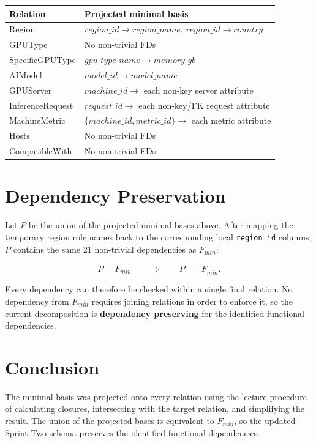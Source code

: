 \documentclass[11pt]{article}
\newcommand{\fd}{\rightarrow}
\newcommand{\code}[1]{\texttt{#1}}
\begin{document}
\begin{center}
\begin{tabular}{>{\raggedright\arraybackslash}p{} >{\raggedright\arraybackslash}p{}}
\toprule
\textbf{Relation} & \textbf{Projected minimal basis}\\
\midrule
Region & $region\_id \fd region\_name$, $region\_id \fd country$\\
GPUType & No non-trivial FDs\\
SpecificGPUType & $gpu\_type\_name \fd memory\_gb$\\
AIModel & $model\_id \fd model\_name$\\
GPUServer & $machine\_id \fd$ each non-key server attribute\\
InferenceRequest & $request\_id \fd$ each non-key/FK request attribute\\
MachineMetric & $\{machine\_id,metric\_id\} \fd$ each metric attribute\\
Hosts & No non-trivial FDs\\
CompatibleWith & No non-trivial FDs\\
\bottomrule
\end{tabular}
\end{center}

\section{Dependency Preservation}

Let $P$ be the union of the projected minimal bases above. After mapping the temporary
region role names back to the corresponding local \code{region\_id} columns, $P$ contains
the same 21 non-trivial dependencies as $F_{min}$:

\[
P = F_{min}
\qquad\Longrightarrow\qquad
P^{+}=F_{min}^{+}.
\]

Every dependency can therefore be checked within a single final relation. No dependency
from $F_{min}$ requires joining relations in order to enforce it, so the current
decomposition is \textbf{dependency preserving} for the identified functional dependencies.

\enlargethispage{3\baselineskip}
\section{Conclusion}

The minimal basis was projected onto every relation using the lecture procedure of
calculating closures, intersecting with the target relation, and simplifying the result.
The union of the projected bases is equivalent to $F_{min}$, so the updated Sprint Two
schema preserves the identified functional dependencies.
\end{document}
